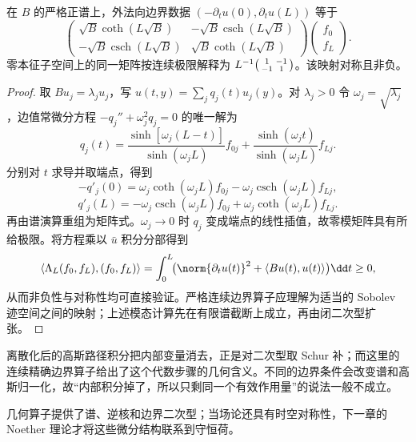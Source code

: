 \begin{theorem}[有限柱体的精确边界算子]\label{thm:ghs-r6-cylinder-dn}
在 $B$ 的严格正谱上，外法向边界数据 $(-\partial_tu(0),\partial_tu(L))$ 等于
\begin{equation}\label{eq:ghs-r6-dn-matrix}
\begin{pmatrix}\sqrt B\coth(L\sqrt B)&-\sqrt B\operatorname{csch}(L\sqrt B)\\
-\sqrt B\operatorname{csch}(L\sqrt B)&\sqrt B\coth(L\sqrt B)\end{pmatrix}
\begin{pmatrix}f_0\\f_L\end{pmatrix}.
\end{equation}
零本征子空间上的同一矩阵按连续极限解释为 $L^{-1}\begin{psmallmatrix}1&-1\\-1&1\end{psmallmatrix}$。该映射对称且非负。
\end{theorem}
\begin{proof}
取 $Bu_j=\lambda_ju_j$，写 $u(t,y)=\sum_jq_j(t)u_j(y)$。对 $\lambda_j>0$ 令 $\omega_j=\sqrt{\lambda_j}$，边值常微分方程 $-q_j''+\omega_j^2q_j=0$ 的唯一解为
\[
q_j(t)=\frac{\sinh[\omega_j(L-t)]}{\sinh(\omega_jL)}f_{0j}
+\frac{\sinh(\omega_jt)}{\sinh(\omega_jL)}f_{Lj}.
\]
分别对 $t$ 求导并取端点，得到
\[
-q'_j(0)=\omega_j\coth(\omega_jL)f_{0j}
-\omega_j\operatorname{csch}(\omega_jL)f_{Lj},
\]
\[
q'_j(L)=-\omega_j\operatorname{csch}(\omega_jL)f_{0j}
+\omega_j\coth(\omega_jL)f_{Lj}.
\]
再由谱演算重组为矩阵式。$\omega_j\to0$ 时 $q_j$ 变成端点的线性插值，故零模矩阵具有所给极限。将方程乘以 $\bar u$ 积分分部得到
\[
\langle \Lambda_L(f_0,f_L),(f_0,f_L)\rangle
=\int_0^L\!\bigl(\norm{\partial_tu(t)}^2+\langle Bu(t), u(t)\rangle\bigr)\dd t\ge0,
\]
从而非负性与对称性均可直接验证。严格连续边界算子应理解为适当的 Sobolev 迹空间之间的映射；上述模态计算先在有限谱截断上成立，再由闭二次型扩张。
\end{proof}

离散化后的高斯路径积分把内部变量消去，正是对二次型取 Schur 补；而这里的连续精确边界算子给出了这个代数步骤的几何含义。不同的边界条件会改变谱和高斯归一化，故“内部积分掉了，所以只剩同一个有效作用量”的说法一般不成立。

几何算子提供了谱、逆核和边界二次型；当场论还具有时空对称性，下一章的 Noether 理论才将这些微分结构联系到守恒荷。
